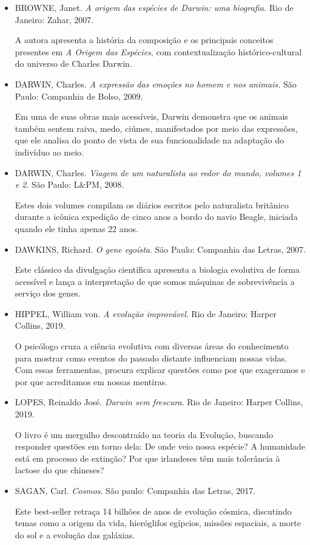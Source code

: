 \documentclass[11pt]{extarticle}
\begin{document}
\begin{itemize}
\item \textsc{BROWNE}, Janet. \emph{A origem das espécies de Darwin: uma biografia.}  Rio de
Janeiro: Zahar, 2007.

A autora apresenta a história da composição e os principais conceitos
presentes em \emph{A Origem das Espécies}, com contextualização
histórico-cultural do universo de Charles Darwin.

\item \textsc{DARWIN}, Charles. \emph{A expressão das emoções no homem e nos animais.} São
Paulo: Companhia de Bolso, 2009.

Em uma de suas obras mais acessíveis, Darwin demonstra que os animais também
sentem raiva, medo, ciúmes, manifestados por meio das expressões, que ele
analisa do ponto de vista de sua funcionalidade na adaptação do indivíduo ao
meio.

\item \textsc{DARWIN}, Charles. \emph{Viagem de um naturalista ao redor do mundo, volumes
1 e 2}. São Paulo: L\&PM, 2008.

Estes dois volumes compilam os diários escritos pelo naturalista britânico
durante a icônica expedição de cinco anos a bordo do navio Beagle, iniciada
quando ele tinha apenas 22 anos.


\item \textsc{DAWKINS}, Richard. \emph{O gene egoísta}. São Paulo: Companhia das Letras,
2007.

Este clássico da divulgação científica apresenta a biologia evolutiva de forma
acessível e lança a interpretação de que somos máquinas de sobrevivência
a serviço dos genes.

\item \textsc{HIPPEL}, William von. \emph{A evolução improvável}. Rio de Janeiro: Harper
Collins, 2019.

O psicólogo cruza a ciência evolutiva com diversas áreas do conhecimento para
mostrar como eventos do passado distante influenciam nossas vidas.  Com essas
ferramentas, procura explicar questões como por que exageramos e por que
acreditamos em nossas mentiras.

\item \textsc{LOPES}, Reinaldo José. \emph{Darwin sem frescura}. Rio de Janeiro: Harper
Collins, 2019.

O livro é um mergulho descontraído na teoria da Evolução, buscando responder
questões em torno dela: De onde veio nossa espécie? A humanidade está em
processo de extinção? Por que irlandeses têm mais tolerância à lactose do que
chineses?

\item \textsc{SAGAN}, Carl. \emph{Cosmos}. São paulo: Companhia das Letras, 2017.

Este best-seller retraça 14 bilhões de anos de evolução cósmica, discutindo
temas como a origem da vida, hieróglifos egípcios, missões espaciais, a morte
do sol e a evolução das galáxias.
\end{itemize}
\end{document}

